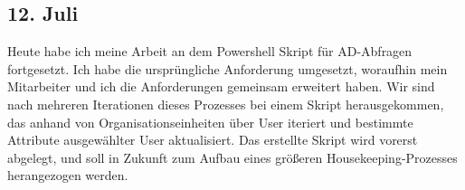 \subsection{12. Juli}
Heute habe ich meine Arbeit an dem Powershell Skript für AD-Abfragen fortgesetzt. Ich habe die ursprüngliche Anforderung umgesetzt, woraufhin mein Mitarbeiter und ich die Anforderungen gemeinsam erweitert haben. Wir sind nach mehreren Iterationen dieses Prozesses bei einem Skript herausgekommen, das anhand von Organisationseinheiten über User iteriert und bestimmte Attribute ausgewählter User aktualisiert. Das erstellte Skript wird vorerst abgelegt, und soll in Zukunft zum Aufbau eines größeren Housekeeping-Prozesses herangezogen werden.